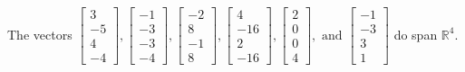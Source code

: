 \begin{exercise}
\begin{exerciseStatement}
  \end{exerciseStatement}
  \begin{exerciseAnswer}
   The vectors \(\left[\begin{array}{r}
3 \\
-5 \\
4 \\
-4
\end{array}\right] , \left[\begin{array}{r}
-1 \\
-3 \\
-3 \\
-4
\end{array}\right] , \left[\begin{array}{r}
-2 \\
8 \\
-1 \\
8
\end{array}\right] , \left[\begin{array}{r}
4 \\
-16 \\
2 \\
-16
\end{array}\right] , \left[\begin{array}{r}
2 \\
0 \\
0 \\
4
\end{array}\right] , \text{ and } \left[\begin{array}{r}
-1 \\
-3 \\
3 \\
1
\end{array}\right]\) 
  	 do  
	span \(\mathbb{R}^4\).
  


  \end{exerciseAnswer}
\end{exercise}